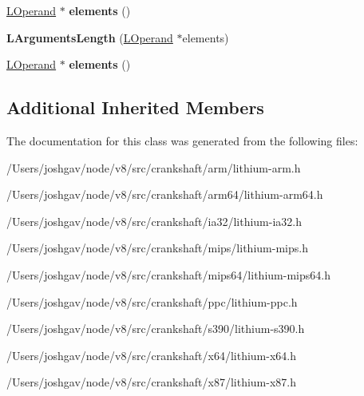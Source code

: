 \begin{DoxyCompactItemize}
\item 
\hyperlink{classv8_1_1internal_1_1_l_operand}{L\+Operand} $\ast$ {\bfseries elements} ()\hypertarget{classv8_1_1internal_1_1_l_arguments_length_a10e6d132064af3bd16bdce142cfa116e}{}\label{classv8_1_1internal_1_1_l_arguments_length_a10e6d132064af3bd16bdce142cfa116e}

\item 
{\bfseries L\+Arguments\+Length} (\hyperlink{classv8_1_1internal_1_1_l_operand}{L\+Operand} $\ast$elements)\hypertarget{classv8_1_1internal_1_1_l_arguments_length_aadb137e4a495964f01a3100bc869881f}{}\label{classv8_1_1internal_1_1_l_arguments_length_aadb137e4a495964f01a3100bc869881f}

\item 
\hyperlink{classv8_1_1internal_1_1_l_operand}{L\+Operand} $\ast$ {\bfseries elements} ()\hypertarget{classv8_1_1internal_1_1_l_arguments_length_a10e6d132064af3bd16bdce142cfa116e}{}\label{classv8_1_1internal_1_1_l_arguments_length_a10e6d132064af3bd16bdce142cfa116e}

\end{DoxyCompactItemize}
\subsection*{Additional Inherited Members}


The documentation for this class was generated from the following files\+:\begin{DoxyCompactItemize}
\item 
/\+Users/joshgav/node/v8/src/crankshaft/arm/lithium-\/arm.\+h\item 
/\+Users/joshgav/node/v8/src/crankshaft/arm64/lithium-\/arm64.\+h\item 
/\+Users/joshgav/node/v8/src/crankshaft/ia32/lithium-\/ia32.\+h\item 
/\+Users/joshgav/node/v8/src/crankshaft/mips/lithium-\/mips.\+h\item 
/\+Users/joshgav/node/v8/src/crankshaft/mips64/lithium-\/mips64.\+h\item 
/\+Users/joshgav/node/v8/src/crankshaft/ppc/lithium-\/ppc.\+h\item 
/\+Users/joshgav/node/v8/src/crankshaft/s390/lithium-\/s390.\+h\item 
/\+Users/joshgav/node/v8/src/crankshaft/x64/lithium-\/x64.\+h\item 
/\+Users/joshgav/node/v8/src/crankshaft/x87/lithium-\/x87.\+h\end{DoxyCompactItemize}
